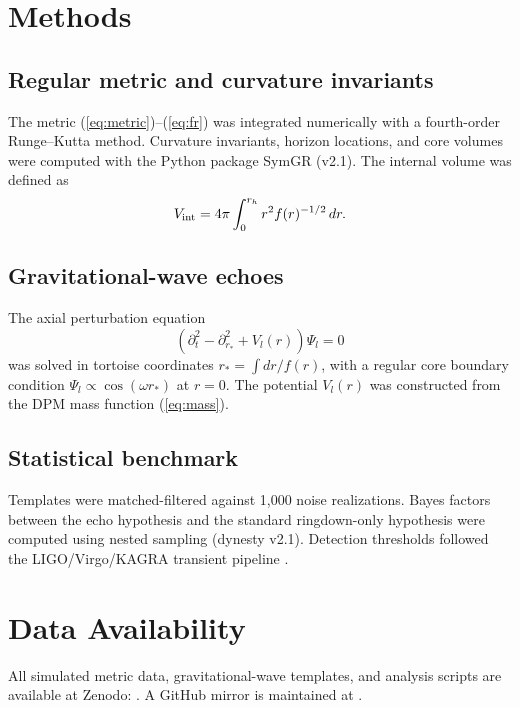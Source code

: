 \documentclass[11pt,a4paper]{article}
\begin{document}
\section{Methods}

\subsection{Regular metric and curvature invariants}

The metric (\ref{eq:metric})--(\ref{eq:fr}) was integrated numerically with a fourth-order Runge--Kutta method. Curvature invariants, horizon locations, and core volumes were computed with the Python package SymGR (v2.1). The internal volume was defined as
\begin{equation}
V_{\rm int} = 4\pi \int_0^{r_h} r^2 f(r)^{-1/2}\,dr.
\label{eq:volume}
\end{equation}

\subsection{Gravitational-wave echoes}

The axial perturbation equation
\begin{equation}
(\partial_t^2 - \partial_{r_*}^2 + V_l(r))\Psi_l = 0
\label{eq:pert}
\end{equation}
was solved in tortoise coordinates $r_* = \int dr/f(r)$, with a regular core boundary condition $\Psi_l \propto \cos(\omega r_*)$ at $r=0$. The potential $V_l(r)$ was constructed from the DPM mass function (\ref{eq:mass}).

\subsection{Statistical benchmark}

Templates were matched-filtered against 1,000 noise realizations. Bayes factors between the echo hypothesis and the standard ringdown-only hypothesis were computed using nested sampling (dynesty v2.1). Detection thresholds followed the LIGO/Virgo/KAGRA transient pipeline \cite{ligo2023}.

\section{Data Availability}

All simulated metric data, gravitational-wave templates, and analysis scripts are available at Zenodo: \url{}. A GitHub mirror is maintained at \url{}.
\end{document}
